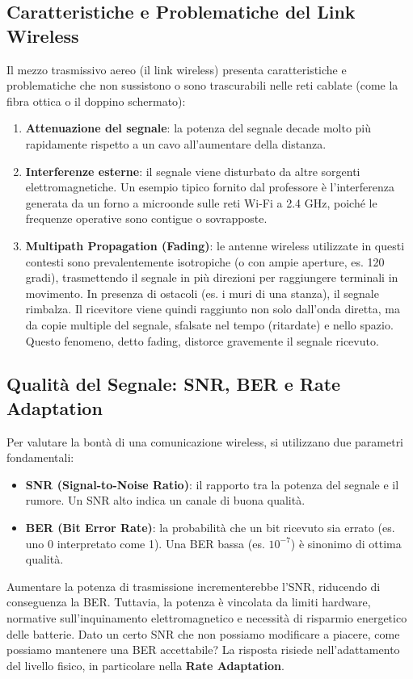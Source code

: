 \subsection{Caratteristiche e Problematiche del Link Wireless}
Il mezzo trasmissivo aereo (il link wireless) presenta caratteristiche e problematiche che non sussistono o sono trascurabili nelle reti cablate (come la fibra ottica o il doppino schermato):
\begin{enumerate}
    \item \textbf{Attenuazione del segnale}: la potenza del segnale decade molto più rapidamente rispetto a un cavo all'aumentare della distanza.
    \item \textbf{Interferenze esterne}: il segnale viene disturbato da altre sorgenti elettromagnetiche. Un esempio tipico fornito dal professore è l'interferenza generata da un forno a microonde sulle reti Wi-Fi a 2.4 GHz, poiché le frequenze operative sono contigue o sovrapposte.
    \item \textbf{Multipath Propagation (Fading)}: le antenne wireless utilizzate in questi contesti sono prevalentemente isotropiche (o con ampie aperture, es. 120 gradi), trasmettendo il segnale in più direzioni per raggiungere terminali in movimento. In presenza di ostacoli (es. i muri di una stanza), il segnale rimbalza. Il ricevitore viene quindi raggiunto non solo dall'onda diretta, ma da copie multiple del segnale, sfalsate nel tempo (ritardate) e nello spazio. Questo fenomeno, detto fading, distorce gravemente il segnale ricevuto.
\end{enumerate}

\subsection{Qualità del Segnale: SNR, BER e Rate Adaptation}
Per valutare la bontà di una comunicazione wireless, si utilizzano due parametri fondamentali:
\begin{itemize}
    \item \textbf{SNR (Signal-to-Noise Ratio)}: il rapporto tra la potenza del segnale e il rumore. Un SNR alto indica un canale di buona qualità.
    \item \textbf{BER (Bit Error Rate)}: la probabilità che un bit ricevuto sia errato (es. uno 0 interpretato come 1). Una BER bassa (es. $10^{-7}$) è sinonimo di ottima qualità.
\end{itemize}

Aumentare la potenza di trasmissione incrementerebbe l'SNR, riducendo di conseguenza la BER. Tuttavia, la potenza è vincolata da limiti hardware, normative sull'inquinamento elettromagnetico e necessità di risparmio energetico delle batterie. Dato un certo SNR che non possiamo modificare a piacere, come possiamo mantenere una BER accettabile? 
La risposta risiede nell'adattamento del livello fisico, in particolare nella \textbf{Rate Adaptation}.

